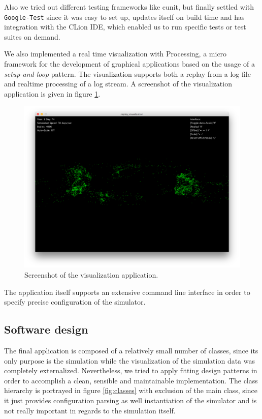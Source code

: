 \documentclass[a4paper,11pt]{scrartcl} %
\begin{document}
Also we tried out different testing frameworks like cunit, but finally settled with \texttt{Google-Test} since it was easy to set up, updates itself on build time and has integration with the CLion IDE, which enabled us to run specific tests or test suites on demand.

We also implemented a real time visualization with Processing, a micro framework for the development of graphical applications based on the usage of a \textit{setup-and-loop} pattern. The visualization supports both a replay from a log file and realtime processing of a log stream. A screenshot of the visualization application is given in figure \ref{fig:vis_app}.

\begin{figure}[h!]
  \centering
  \includegraphics[width=\textwidth]{img/visualization.png}
  \caption{Screenshot of the visualization application.}
  \label{fig:vis_app}
\end{figure}

The application itself supports an extensive command line interface in order to specify precise configuration of the simulator.

\subsection{Software design}
\label{software_design}
The final application is composed of a relatively small number of classes, since its only purpose is the simulation while the visualization of the simulation data was completely externalized. Nevertheless, we tried to apply fitting design patterns in order to accomplish a clean, sensible and maintainable implementation. The class hierarchy is portrayed in figure \ref{fig:classes} with exclusion of the main class, since it just provides configuration parsing as well instantiation of the simulator and is not really important in regards to the simulation itself.
\end{document}
